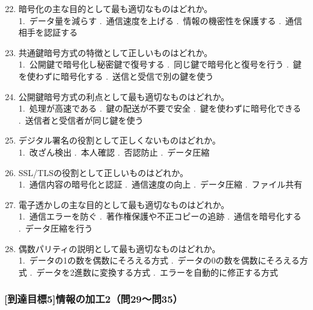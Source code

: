 \documentclass[b4paper,7pt,twocolumn,landscape]{jsarticle}
\begin{document}
\begin{enumerate}
\setcounter{enumi}{21}
\item 暗号化の主な目的として最も適切なものはどれか。\\
1.~データ量を減らす .~通信速度を上げる .~情報の機密性を保護する .~通信相手を認証する

\item 共通鍵暗号方式の特徴として正しいものはどれか。\\
1.~公開鍵で暗号化し秘密鍵で復号する .~同じ鍵で暗号化と復号を行う .~鍵を使わずに暗号化する .~送信と受信で別の鍵を使う

\item 公開鍵暗号方式の利点として最も適切なものはどれか。\\
1.~処理が高速である .~鍵の配送が不要で安全 .~鍵を使わずに暗号化できる .~送信者と受信者が同じ鍵を使う

\item デジタル署名の役割として正しくないものはどれか。\\
1.~改ざん検出 .~本人確認 .~否認防止 .~データ圧縮

\item SSL/TLSの役割として正しいものはどれか。\\
1.~通信内容の暗号化と認証 .~通信速度の向上 .~データ圧縮 .~ファイル共有

\newpage

\item 電子透かしの主な目的として最も適切なものはどれか。\\
1.~通信エラーを防ぐ .~著作権保護や不正コピーの追跡 .~通信を暗号化する .~データ圧縮を行う

\item 偶数パリティの説明として最も適切なものはどれか。\\
1.~データの1の数を偶数にそろえる方式 .~データの0の数を偶数にそろえる方式 .~データを2進数に変換する方式 .~エラーを自動的に修正する方式
\end{enumerate}



\subsubsection*{[到達目標5]情報の加工2（問29〜問35）}
\end{document}
